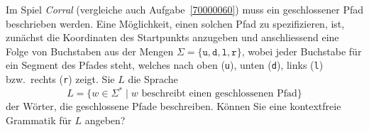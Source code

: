 Im Spiel {\em Corral} (vergleiche auch Aufgabe~\ref{70000060})
muss ein geschlossener Pfad beschrieben werden.
Eine Möglichkeit, einen solchen Pfad zu spezifizieren, ist, zunächst
die Koordinaten des Startpunkts anzugeben und anschliessend eine
Folge von Buchstaben aus der Mengen
$\Sigma=\{\texttt{u},\texttt{d},\texttt{l},\texttt{r}\}$,
wobei jeder Buchstabe für ein Segment des Pfades steht, welches 
nach oben (\texttt{u}),
unten (\texttt{d}),
links (\texttt{l})
bzw.~rechts (\texttt{r})
zeigt.
Sie $L$ die Sprache
\[
L
=
\{
w\in \Sigma^*
\mid
\text{$w$ beschreibt einen geschlossenen Pfad}
\}
\]
der Wörter, die geschlossene Pfade beschreiben.
Können Sie eine kontextfreie Grammatik für $L$ angeben?



